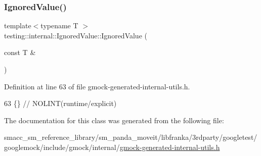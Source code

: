 \subsubsection{\texorpdfstring{Ignored\+Value()}{IgnoredValue()}}
{\footnotesize\ttfamily template$<$typename T $>$ \\
testing\+::internal\+::\+Ignored\+Value\+::\+Ignored\+Value (\begin{DoxyParamCaption}\item[{const T \&}]{ }\end{DoxyParamCaption})\hspace{0.3cm}{\ttfamily [inline]}}



Definition at line 63 of file gmock-\/generated-\/internal-\/utils.\+h.


\begin{DoxyCode}
63 \{\}  \textcolor{comment}{// NOLINT(runtime/explicit)}
\end{DoxyCode}


The documentation for this class was generated from the following file\+:\begin{DoxyCompactItemize}
\item 
smacc\+\_\+sm\+\_\+reference\+\_\+library/sm\+\_\+panda\+\_\+moveit/libfranka/3rdparty/googletest/googlemock/include/gmock/internal/\hyperlink{gmock-generated-internal-utils_8h}{gmock-\/generated-\/internal-\/utils.\+h}\end{DoxyCompactItemize}
